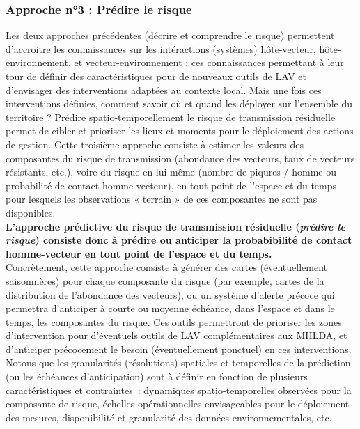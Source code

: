 \documentclass[12pt,twoside]{reedthesis}
\begin{document}
\hypertarget{predict-risk}{%
\subsubsection{Approche n°3 : Prédire le risque}\label{predict-risk}}

Les deux approches précédentes (décrire et comprendre le risque) permettent d'accroitre les connaissances sur les intéractions (systèmes) hôte-vecteur, hôte-environnement, et vecteur-environnement ; ces connaissances permettant à leur tour de définir des caractéristiques pour de nouveaux outils de LAV et d'envisager des interventions adaptées au contexte local. Mais une fois ces interventions définies, comment savoir où et quand les déployer sur l'ensemble du territoire ? Prédire spatio-temporellement le risque de transmission résiduelle permet de cibler et prioriser les lieux et moments pour le déploiement des actions de gestion. Cette troisième approche consiste à estimer les valeurs des composantes du risque de transmission (abondance des vecteurs, taux de vecteurs résistants, etc.), voire du risque en lui-même (nombre de piqures / homme ou probabilité de contact homme-vecteur), en tout point de l'espace et du temps pour lesquels les observations « terrain » de ces composantes ne sont pas disponibles.\\

\textbf{L'approche prédictive du risque de transmission résiduelle (\emph{prédire le risque}) consiste donc à prédire ou anticiper la probabibilité de contact homme-vecteur en tout point de l'espace et du temps.}\\

Concrètement, cette approche consiste à générer des cartes (éventuellement saisonnières) pour chaque composante du risque (par exemple, cartes de la distribution de l'abondance des vecteurs), ou un système d'alerte précoce qui permettra d'anticiper à courte ou moyenne échéance, dans l'espace et dans le temps, les composantes du risque. Ces outils permettront de prioriser les zones d'intervention pour d'éventuels outils de LAV complémentaires aux MIILDA, et d'anticiper précocement le besoin (éventuellement ponctuel) en ces interventions. Notons que les granularités (résolutions) spatiales et temporelles de la prédiction (ou les échéances d'anticipation) sont à définir en fonction de plusieurs caractéristiques et contraintes~: dynamiques spatio-temporelles observées pour la composante de risque, échelles opérationnelles envisageables pour le déploiement des mesures, disponibilité et granularité des données environnementales, etc.\\
\end{document}
